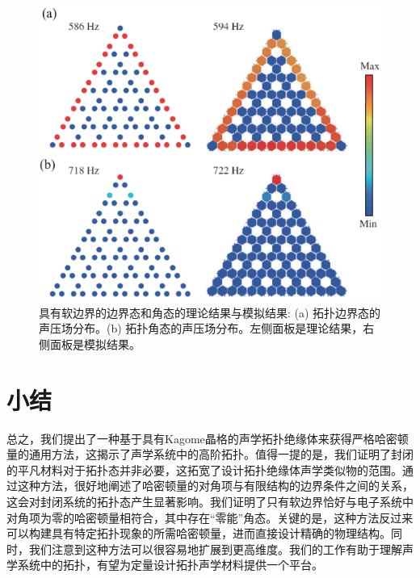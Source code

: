 \begin{figure}[h!]
  \centering
  \includegraphics[width=1\textwidth]{images/fig3-12.eps} 
  \caption{具有软边界的边界态和角态的理论结果与模拟结果: (a) 拓扑边界态的声压场分布。(b) 拓扑角态的声压场分布。左侧面板是理论结果，右侧面板是模拟结果。}
  \label{fig_3_12}
\end{figure}

\section{小结}
总之，我们提出了一种基于具有Kagome晶格的声学拓扑绝缘体来获得严格哈密顿量的通用方法，这揭示了声学系统中的高阶拓扑。值得一提的是，我们证明了封闭的平凡材料对于拓扑态并非必要，这拓宽了设计拓扑绝缘体声学类似物的范围。通过这种方法，很好地阐述了哈密顿量的对角项与有限结构的边界条件之间的关系，这会对封闭系统的拓扑态产生显著影响。我们证明了只有软边界恰好与电子系统中对角项为零的哈密顿量相符合，其中存在“零能”角态。关键的是，这种方法反过来可以构建具有特定拓扑现象的所需哈密顿量，进而直接设计精确的物理结构。同时，我们注意到这种方法可以很容易地扩展到更高维度。我们的工作有助于理解声学系统中的拓扑，有望为定量设计拓扑声学材料提供一个平台。